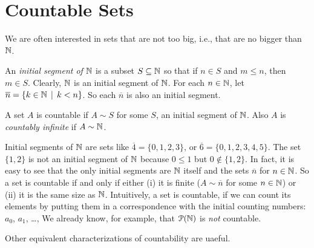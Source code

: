 \chapter{Countable Sets}

We are often interested in sets that are not too big, i.e., that are no bigger than $\mathbb N$.

\begin{defn}
An \emph{initial segment of $\mathbb N$} is a subset $S\subseteq \mathbb N$ so that if $n\in S$ and $m\leq n$, then $m\in S$. Clearly, $\mathbb N$ is an initial segment of $\mathbb N$.
For each $n\in \mathbb N$, let $\overline n = \{k\in \mathbb N\,\mid\, k<n\}$. So each $\overline n$ is also an initial segment.

A set $A$ is countable if $A\sim S$ for some $S$, an initial segment of $\mathbb N$. Also $A$ is \emph{countably infinite} if $A\sim \mathbb N$.
\end{defn}

Initial segments of $\mathbb N$ are sets like $\overline 4=\{0,1,2,3\}$, or $\overline 6 = \{0,1,2,3,4,5\}$. 
The set $\{1,2\}$ is not an initial segment of $\mathbb N$ because $0\leq 1$ but $0\notin \{1,2\}$. In fact, it is easy to see that the only initial segments are $\mathbb N$ itself and the sets $\overline n$ for $n\in\mathbb N$. 
So a set is countable if and only if either (i) it is finite ($A\sim\overline n$ for some $n\in\mathbb N$) or (ii) it is the same size as $\mathbb N$. 
Intuitively, a set is countable, if we can count its elements by putting them in a correspondence with the initial counting numbers: $a_0$, $a_1$, \ldots,  
We already know, for example, that ${\mathcal{P}}(\mathbb N)$ is \emph{not} countable.

Other equivalent characterizations of countability are uaeful.

